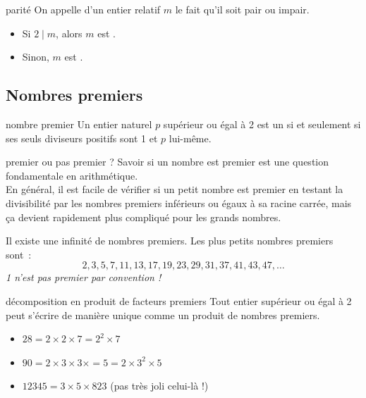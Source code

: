 \documentclass[12pt]{article}
\begin{document}
\begin{definition}{}{parité}
    On appelle  d'un entier relatif $m$ le fait qu'il soit pair ou impair.
    \begin{itemize}
        \item Si $2 \mid m$, alors $m$ est .
        \item Sinon, $m$ est .
    \end{itemize}
\end{definition}

\subsection{Nombres premiers}

\begin{definition}{}{nombre premier}
    Un entier naturel \(p\) supérieur ou égal à 2 est un  si et seulement si ses seuls diviseurs positifs sont 1 et \(p\) lui-même.
\end{definition}

\begin{remarque}{}{premier ou pas premier ?}
    Savoir si un nombre est premier est une question fondamentale en arithmétique. \\
    En général, il est facile de vérifier si un petit nombre est premier en testant la divisibilité par les nombres premiers inférieurs ou égaux à sa racine carrée, mais ça devient rapidement plus compliqué pour les grands nombres.
\end{remarque}

\begin{remarque}{}{}
    Il existe une infinité de nombres premiers. Les plus petits nombres premiers sont~:
    \[2, 3, 5, 7, 11, 13, 17, 19, 23, 29, 31, 37, 41, 43, 47, \dots\]
    \textit{1 n'est pas premier par convention !}
\end{remarque}

\begin{theoreme}{}{décomposition en produit de facteurs premiers}
    Tout entier supérieur ou égal à 2 peut s'écrire de manière unique comme un produit de nombres premiers.
\end{theoreme}

\begin{exemple}{}{}
    \begin{itemize}
        \item $28 = 2 \times 2 \times 7 = 2^2 \times 7$
        \item $90 = 2 \times 3 \times 3 \times = 5 = 2 \times 3^2 \times 5$
        \item $12345 = 3 \times 5 \times 823$ (pas très joli celui-là !)
    \end{itemize}
\end{exemple}
\end{document}
